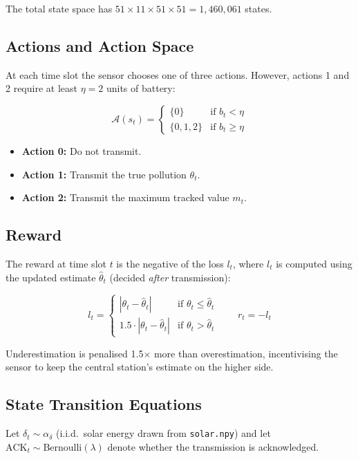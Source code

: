 \documentclass[12pt, a4paper]{article}
\begin{document}
The total state space has $51 \times 11 \times 51 \times 51 = 1{,}460{,}061$ states.

\subsection{Actions and Action Space}

At each time slot the sensor chooses one of three actions. However, actions 1 and 2 require at least $\eta = 2$ units of battery:

\[
\mathcal{A}(s_t) = \begin{cases} \{0\} & \text{if } b_t < \eta \\ \{0, 1, 2\} & \text{if } b_t \geq \eta \end{cases}
\]

\begin{itemize}
    \item \textbf{Action 0:} Do not transmit.
    \item \textbf{Action 1:} Transmit the true pollution $\theta_t$.
    \item \textbf{Action 2:} Transmit the maximum tracked value $m_t$.
\end{itemize}

\subsection{Reward}

The reward at time slot $t$ is the negative of the loss $l_t$, where $l_t$ is computed using the updated estimate $\hat{\theta}_t$ (decided \emph{after} transmission):

\[
l_t = \begin{cases} |\theta_t - \hat{\theta}_t| & \text{if } \theta_t \leq \hat{\theta}_t \\ 1.5 \cdot |\theta_t - \hat{\theta}_t| & \text{if } \theta_t > \hat{\theta}_t \end{cases}
\qquad r_t = -l_t
\]

Underestimation is penalised 1.5$\times$ more than overestimation, incentivising the sensor to keep the central station's estimate on the higher side.

\subsection{State Transition Equations}

Let $\delta_t \sim \alpha_\delta$ (i.i.d.\ solar energy drawn from \texttt{solar.npy}) and let $\text{ACK}_t \sim \text{Bernoulli}(\lambda)$ denote whether the transmission is acknowledged.
\end{document}
